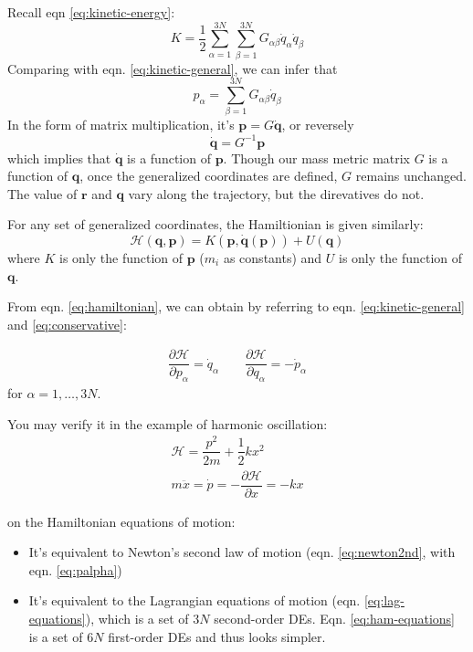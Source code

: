 \documentclass[
  10pt,
  twoside,
  openany,
  b5paper, %
  colorscheme = bootstrap-v4, %
]{qyxf-book}
\newcommand{\p}[2]{\dfrac{\partial #1}{\partial #2}}
\newcommand{\vr}{\boldsymbol{r}}
\newcommand{\vp}{\boldsymbol{p}}
\newcommand{\vq}{\boldsymbol{q}}
\newcommand{\dvq}{\dot{\vq}}
\newcommand{\half}{\dfrac{1}{2}}
\newcommand{\suman}{\sum_{\alpha=1}^{3N}}
\newcommand{\ham}{\mathcal{H}} %
\begin{document}
Recall eqn \ref{eq:kinetic-energy}:
\begin{equation*}
	K=\half\suman\sum_{\beta=1}^{3N}G_{\alpha\beta}\dot{q}_\alpha\dot{q}_\beta
\end{equation*}
Comparing with eqn. \ref{eq:kinetic-general}, we can infer that
\begin{equation}
	p_\alpha=\sum_{\beta=1}^{3N}G_{\alpha\beta}\dot{q}_\beta
\end{equation}
In the form of matrix multiplication, it's $\vp=G\dvq$, or reversely
\begin{equation}
	\dvq=G^{-1}\vp
\end{equation}
which implies that $\dvq$ is a function of $\vp$. Though our mass metric matrix $G$ is a function of $\vq$, once the generalized coordinates are defined, $G$ remains unchanged. The value of $\vr$ and $\vq$ vary along the trajectory, but the direvatives do not.

For any set of generalized coordinates, the Hamiltionian is given similarly:
\begin{equation}
	\ham(\vq,\vp)=K(\vp,\dvq(\vp))+U(\vq) \label{eq:hamiltonian}
\end{equation}
where $K$ is only the function of $\vp$ ($m_i$ as constants) and $U$ is only the function of $\vq$.

From eqn. \ref{eq:hamiltonian}, we can obtain by referring to eqn. \ref{eq:kinetic-general} and \ref{eq:conservative}:
\begin{tcolorbox}[title={Hamiltonian's equations of motion}]
	\begin{gather}
		\p{\ham}{p_\alpha}=\dot{q}_\alpha \qquad \p{\ham}{q_\alpha}=-\dot{p}_\alpha
		\label{eq:ham-equations}
	\end{gather}
	for $\alpha=1,\dots,3N$. 
\end{tcolorbox}

\example You may verify it in the example of harmonic oscillation:
\begin{gather*}
	\ham=\dfrac{p^2}{2m}+\half kx^2\\
	m\ddot{x}=\dot{p}=-\p{\ham}{x}=-kx
\end{gather*}

\mynote on the Hamiltonian equations of motion:
\begin{itemize}
	\item It's equivalent to Newton's second law of motion (eqn. \ref{eq:newton2nd}, with eqn. \ref{eq:palpha})
	\item It's equivalent to the Lagrangian equations of motion (eqn. \ref{eq:lag-equations}), which is a set of $3N$ second-order DEs. Eqn. \ref{eq:ham-equations} is a set of $6N$ first-order DEs and thus looks simpler.
\end{itemize}
\end{document}
